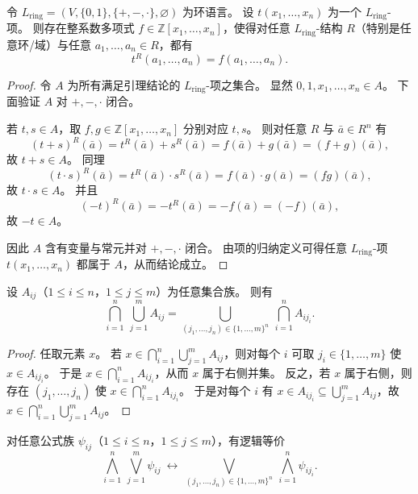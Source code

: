 \documentclass[lang=cn,a4paper,newtx,section]{elegantbook}
\begin{document}
\begin{lemma}
\label{ring-terms-are-integer-polynomials}
令 $L_{\mathrm{ring}}=(V,\{0,1\},\{+,-,\cdot\},\varnothing)$ 为环语言。
设 $t(x_1,\dots,x_n)$ 为一个 $L_{\mathrm{ring}}$-项。
则存在整系数多项式 $f\in\mathbb Z[x_1,\dots,x_n]$，使得对任意 $L_{\mathrm{ring}}$-结构 $R$（特别是任意环/域）与任意 $a_1,\dots,a_n\in R$，都有
\[
  t^{R}(a_1,\dots,a_n)=f(a_1,\dots,a_n).
\]
\end{lemma}

\begin{proof}
令 $A$ 为所有满足引理结论的 $L_{\mathrm{ring}}$-项之集合。
显然 $0,1,x_1,\dots,x_n\in A$。
下面验证 $A$ 对 $+,-,\cdot$ 闭合。

若 $t,s\in A$，取 $f,g\in\mathbb Z[x_1,\dots,x_n]$ 分别对应 $t,s$。
则对任意 $R$ 与 $\bar a\in R^n$ 有
\[
  (t+s)^R(\bar a)=t^R(\bar a)+s^R(\bar a)=f(\bar a)+g(\bar a)=(f+g)(\bar a),
\]
故 $t+s\in A$。
同理
\[
  (t\cdot s)^R(\bar a)=t^R(\bar a)\cdot s^R(\bar a)=f(\bar a)\cdot g(\bar a)=(fg)(\bar a),
\]
故 $t\cdot s\in A$。
并且
\[
  (-t)^R(\bar a)=-t^R(\bar a)=-f(\bar a)=(-f)(\bar a),
\]
故 $-t\in A$。

因此 $A$ 含有变量与常元并对 $+,-,\cdot$ 闭合。
由项的归纳定义可得任意 $L_{\mathrm{ring}}$-项 $t(x_1,\dots,x_n)$ 都属于 $A$，从而结论成立。
\end{proof}

\begin{lemma}[集合的分配律]
\label{set-distributive-law}
设 $A_{ij}$（$1\le i\le n$，$1\le j\le m$）为任意集合族。
则有
\[
\bigcap_{i=1}^n\ \bigcup_{j=1}^m A_{ij}=\bigcup_{(j_1,\dots,j_n)\in\{1,\dots,m\}^n}\ \bigcap_{i=1}^n A_{i j_i}.
\]
\end{lemma}

\begin{proof}
任取元素 $x$。
若 $x\in\bigcap_{i=1}^n\bigcup_{j=1}^m A_{ij}$，则对每个 $i$ 可取 $j_i\in\{1,\dots,m\}$ 使 $x\in A_{i j_i}$。
于是 $x\in\bigcap_{i=1}^n A_{i j_i}$，从而 $x$ 属于右侧并集。
反之，若 $x$ 属于右侧，则存在 $(j_1,\dots,j_n)$ 使 $x\in\bigcap_{i=1}^n A_{i j_i}$。
于是对每个 $i$ 有 $x\in A_{i j_i}\subseteq\bigcup_{j=1}^m A_{ij}$，故 $x\in\bigcap_{i=1}^n\bigcup_{j=1}^m A_{ij}$。
\end{proof}

\begin{lemma}[公式的分配律]
\label{formula-distributive-law}
对任意公式族 $\psi_{ij}$（$1\le i\le n$，$1\le j\le m$），有逻辑等价
\[
  \bigwedge_{i=1}^n\ \bigvee_{j=1}^m\psi_{ij}
  \ \leftrightarrow\ 
  \bigvee_{(j_1,\dots,j_n)\in\{1,\dots,m\}^n}\ \bigwedge_{i=1}^n\psi_{i j_i}.
\]
\end{lemma}
\end{document}
